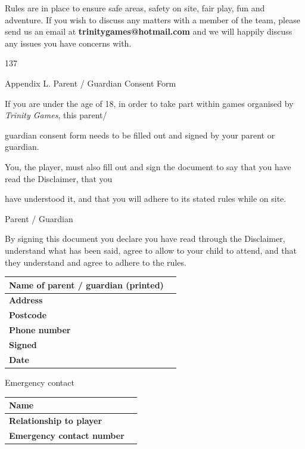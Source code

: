 Rules are in place to ensure safe areas, safety on site, fair play, fun and adventure. If you wish to discuss any matters with a member of the team, please send us an email at \textbf{trinitygames@hotmail.com} and we will happily discuss any issues you have concerns with.

137

Appendix L. Parent / Guardian Consent Form

If you are under the age of 18, in order to take part within games organised by \textit{Trinity Games}, this parent/

guardian consent form needs to be filled out and signed by your parent or guardian.

You, the player, must also fill out and sign the document to say that you have read the Disclaimer, that you

have understood it, and that you will adhere to its stated rules while on site.

Parent / Guardian

By signing this document you declare you have read through the Disclaimer, understand what has been said, agree to allow to your child to attend, and that they understand and agree to adhere to the rules.

\begin{table}
\begin{tabular}{|l|l|} \hline 
\textbf{Name of parent / guardian (printed)} &  \\
 \hline \textbf{Address} &  \\
 \hline \textbf{Postcode} &  \\
 \hline \textbf{Phone number} &  \\
 \hline \textbf{Signed} &  \\
 \hline \textbf{Date} &  \\
 \hline \end{tabular}

\end{table}

Emergency contact

\begin{table}
\begin{tabular}{|l|l|} \hline 
\textbf{Name} &  \\
 \hline \textbf{Relationship to player} &  \\
 \hline \textbf{Emergency contact number} &  \\
 \hline \end{tabular}

\end{table}

